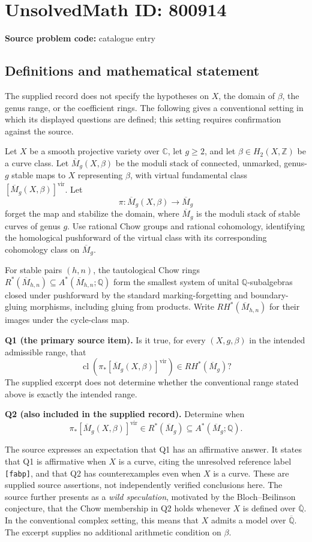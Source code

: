 \documentclass[11pt]{article}
\newcommand{\Z}{\mathbb{Z}}
\newcommand{\Q}{\mathbb{Q}}
\newcommand{\C}{\mathbb{C}}
\begin{document}
\section*{UnsolvedMath ID: 800914}
\textbf{Source problem code:} catalogue entry
\subsection{Definitions and mathematical statement}
The supplied record does not specify the hypotheses on \(X\), the domain of \(\beta\), the genus range, or the coefficient rings. The following gives a conventional setting in which its displayed questions are defined; this setting requires confirmation against the source.

Let \(X\) be a smooth projective variety over \(\C\), let \(g\geq 2\), and let \(\beta\in H_2(X,\Z)\) be a curve class. Let \(\overline{M}_g(X,\beta)\) be the moduli stack of connected, unmarked, genus-\(g\) stable maps to \(X\) representing \(\beta\), with virtual fundamental class \([\overline{M}_g(X,\beta)]^{\operatorname{vir}}\). Let
\[
\pi:\overline{M}_g(X,\beta)\longrightarrow\overline{M}_g
\]
forget the map and stabilize the domain, where \(\overline{M}_g\) is the moduli stack of stable curves of genus \(g\). Use rational Chow groups and rational cohomology, identifying the homological pushforward of the virtual class with its corresponding cohomology class on \(\overline{M}_g\).

For stable pairs \((h,n)\), the tautological Chow rings \(R^*(\overline{M}_{h,n})\subseteq A^*(\overline{M}_{h,n};\Q)\) form the smallest system of unital \(\Q\)-subalgebras closed under pushforward by the standard marking-forgetting and boundary-gluing morphisms, including gluing from products. Write \(RH^*(\overline{M}_{h,n})\) for their images under the cycle-class map.

\textbf{Q1 (the primary source item).} Is it true, for every \((X,g,\beta)\) in the intended admissible range, that
\[
\operatorname{cl}\!\left(\pi_*[\overline{M}_g(X,\beta)]^{\operatorname{vir}}\right)
\in RH^*(\overline{M}_g)?
\]
The supplied excerpt does not determine whether the conventional range stated above is exactly the intended range.

\textbf{Q2 (also included in the supplied record).} Determine when
\[
\pi_*[\overline{M}_g(X,\beta)]^{\operatorname{vir}}
\in R^*(\overline{M}_g)
\subseteq A^*(\overline{M}_g;\Q).
\]

The source expresses an expectation that Q1 has an affirmative answer. It states that Q1 is affirmative when \(X\) is a curve, citing the unresolved reference label \texttt{[fabp]}, and that Q2 has counterexamples even when \(X\) is a curve. These are supplied source assertions, not independently verified conclusions here. The source further presents as a \emph{wild speculation}, motivated by the Bloch--Beilinson conjecture, that the Chow membership in Q2 holds whenever \(X\) is defined over \(\overline{\Q}\). In the conventional complex setting, this means that \(X\) admits a model over \(\overline{\Q}\). The excerpt supplies no additional arithmetic condition on \(\beta\).
\end{document}
